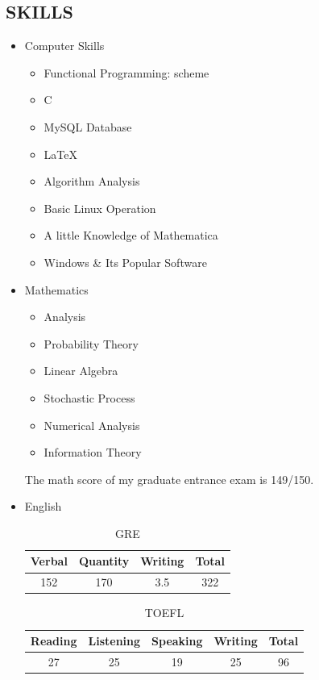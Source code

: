 \documentclass{res}
\begin{document}
\begin{resume}
\section{SKILLS}
\begin{itemize}
\item Computer Skills
\begin{itemize}
\item Functional Programming: scheme
\item C
\item MySQL Database
\item \LaTeX\
\item Algorithm Analysis
\item Basic Linux Operation
\item A little Knowledge of Mathematica
\item Windows \& Its Popular Software
\end{itemize}
\item Mathematics
\begin{itemize}
\item Analysis
\item Probability Theory
\item Linear Algebra
\item Stochastic Process
\item Numerical Analysis
\item Information Theory
\end{itemize}
The math score of my graduate entrance exam is 149/150.  
\item English
\begin{table}[H]
\begin{center}
\caption*{GRE}
\begin{tabular}{cccc}
\toprule
Verbal   & Quantity & Writing   &Total   \\
\midrule
152 & 170 & 3.5 & 322 \\  
\bottomrule
\end{tabular}
\end{center}
\end{table}


\begin{table}[H]
\begin{center}
\caption*{TOEFL}
\begin{tabular}{ccccc}
\toprule
Reading & Listening  &  Speaking & Writing & Total \\ 
\midrule
27 & 25 & 19 & 25 & 96 \\  
\bottomrule
\end{tabular}
\end{center}
\end{table}
\end{itemize}
 

\end{resume}
\end{document}
